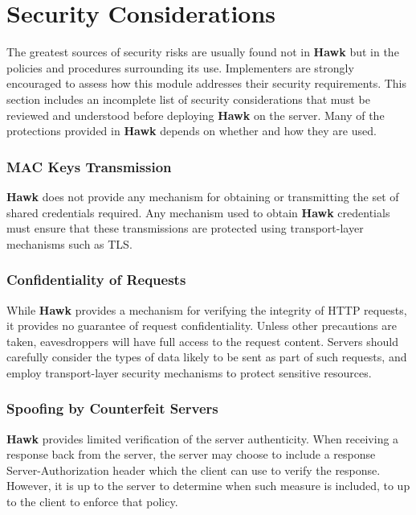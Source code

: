 \section*{Security Considerations}

The greatest sources of security risks are usually found not in {\bfseries Hawk} but in the policies and procedures surrounding its use. Implementers are strongly encouraged to assess how this module addresses their security requirements. This section includes an incomplete list of security considerations that must be reviewed and understood before deploying {\bfseries Hawk} on the server. Many of the protections provided in {\bfseries Hawk} depends on whether and how they are used.

\subsubsection*{M\+A\+C Keys Transmission}

{\bfseries Hawk} does not provide any mechanism for obtaining or transmitting the set of shared credentials required. Any mechanism used to obtain {\bfseries Hawk} credentials must ensure that these transmissions are protected using transport-\/layer mechanisms such as T\+L\+S.

\subsubsection*{Confidentiality of Requests}

While {\bfseries Hawk} provides a mechanism for verifying the integrity of H\+T\+T\+P requests, it provides no guarantee of request confidentiality. Unless other precautions are taken, eavesdroppers will have full access to the request content. Servers should carefully consider the types of data likely to be sent as part of such requests, and employ transport-\/layer security mechanisms to protect sensitive resources.

\subsubsection*{Spoofing by Counterfeit Servers}

{\bfseries Hawk} provides limited verification of the server authenticity. When receiving a response back from the server, the server may choose to include a response {\ttfamily Server-\/\+Authorization} header which the client can use to verify the response. However, it is up to the server to determine when such measure is included, to up to the client to enforce that policy.

